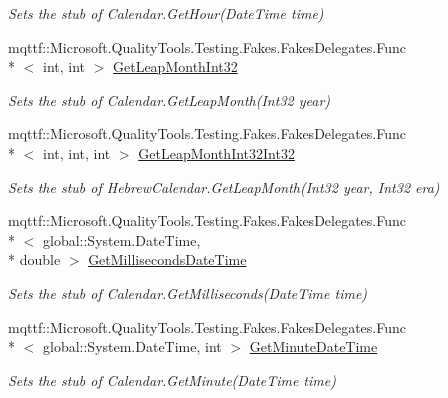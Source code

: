 \begin{DoxyCompactItemize}
\begin{DoxyCompactList}\small\item\em Sets the stub of Calendar.\-Get\-Hour(\-Date\-Time time)\end{DoxyCompactList}\item 
mqttf\-::\-Microsoft.\-Quality\-Tools.\-Testing.\-Fakes.\-Fakes\-Delegates.\-Func\\*
$<$ int, int $>$ \hyperlink{class_system_1_1_globalization_1_1_fakes_1_1_stub_hebrew_calendar_a54bf85b8a63bd7844f15c5efe48256ba}{Get\-Leap\-Month\-Int32}
\begin{DoxyCompactList}\small\item\em Sets the stub of Calendar.\-Get\-Leap\-Month(\-Int32 year)\end{DoxyCompactList}\item 
mqttf\-::\-Microsoft.\-Quality\-Tools.\-Testing.\-Fakes.\-Fakes\-Delegates.\-Func\\*
$<$ int, int, int $>$ \hyperlink{class_system_1_1_globalization_1_1_fakes_1_1_stub_hebrew_calendar_af9849b4943cdb95c1e711bd0954ef500}{Get\-Leap\-Month\-Int32\-Int32}
\begin{DoxyCompactList}\small\item\em Sets the stub of Hebrew\-Calendar.\-Get\-Leap\-Month(\-Int32 year, Int32 era)\end{DoxyCompactList}\item 
mqttf\-::\-Microsoft.\-Quality\-Tools.\-Testing.\-Fakes.\-Fakes\-Delegates.\-Func\\*
$<$ global\-::\-System.\-Date\-Time, \\*
double $>$ \hyperlink{class_system_1_1_globalization_1_1_fakes_1_1_stub_hebrew_calendar_a46154807860844c47080516c2d799097}{Get\-Milliseconds\-Date\-Time}
\begin{DoxyCompactList}\small\item\em Sets the stub of Calendar.\-Get\-Milliseconds(\-Date\-Time time)\end{DoxyCompactList}\item 
mqttf\-::\-Microsoft.\-Quality\-Tools.\-Testing.\-Fakes.\-Fakes\-Delegates.\-Func\\*
$<$ global\-::\-System.\-Date\-Time, int $>$ \hyperlink{class_system_1_1_globalization_1_1_fakes_1_1_stub_hebrew_calendar_a7c510fa318acc94945cde12f30c2c582}{Get\-Minute\-Date\-Time}
\begin{DoxyCompactList}\small\item\em Sets the stub of Calendar.\-Get\-Minute(\-Date\-Time time)\end{DoxyCompactList}\item 

\end{DoxyCompactItemize}
